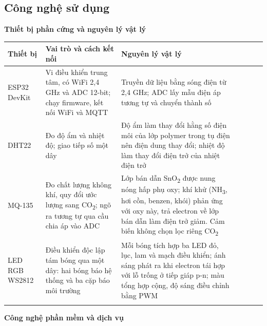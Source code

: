 \documentclass[12pt,a4paper]{article}
\renewcommand{\normalsize}{\fontsize{13pt}{13pt}\selectfont}
\renewcommand{\small}{\fontsize{12pt}{12pt}\selectfont}
\newcommand{\outerline}{\Xhline{0.9pt}}
\begin{document}
\subsection{Công nghệ sử dụng}
\label{sec:congnghe}
\textbf{Thiết bị phần cứng và nguyên lý vật lý}

\small
\begin{tabularx}{\linewidth}{I L{2.3cm} i L{4.0cm} i Y I}
\outerline
{}\textbf{Thiết bị} & \textbf{Vai trò và cách kết nối} & \textbf{Nguyên lý vật lý} \\
\hline
ESP32 DevKit & Vi điều khiển trung tâm, có WiFi 2,4 GHz và ADC 12-bit; chạy firmware, kết nối WiFi và MQTT & Truyền dữ liệu bằng sóng điện từ 2,4 GHz; ADC lấy mẫu điện áp tương tự và chuyển thành số \\
\hline
DHT22 & Đo độ ẩm và nhiệt độ; giao tiếp số một dây & Độ ẩm làm thay đổi hằng số điện môi của lớp polymer trong tụ điện nên điện dung thay đổi; nhiệt độ làm thay đổi điện trở của nhiệt điện trở \\
\hline
MQ-135 & Đo chất lượng không khí, quy đổi ước lượng sang CO\textsubscript{2}; ngõ ra tương tự qua cầu chia áp vào ADC & Lớp bán dẫn SnO\textsubscript{2} được nung nóng hấp phụ oxy; khí khử (NH\textsubscript{3}, hơi cồn, benzen, khói) phản ứng với oxy này, trả electron về lớp bán dẫn làm điện trở giảm. Cảm biến không chọn lọc riêng CO\textsubscript{2} \\
\hline
LED RGB WS2812 & Điều khiển độc lập tám bóng qua một dây: hai bóng báo hệ thống và ba cặp báo môi trường & Mỗi bóng tích hợp ba LED đỏ, lục, lam và mạch điều khiển; ánh sáng phát ra khi electron tái hợp với lỗ trống ở tiếp giáp p-n; màu tổng hợp cộng, độ sáng điều chỉnh bằng PWM \\
\outerline
\end{tabularx}
\normalsize

\medskip
\textbf{Công nghệ phần mềm và dịch vụ}
\end{document}
